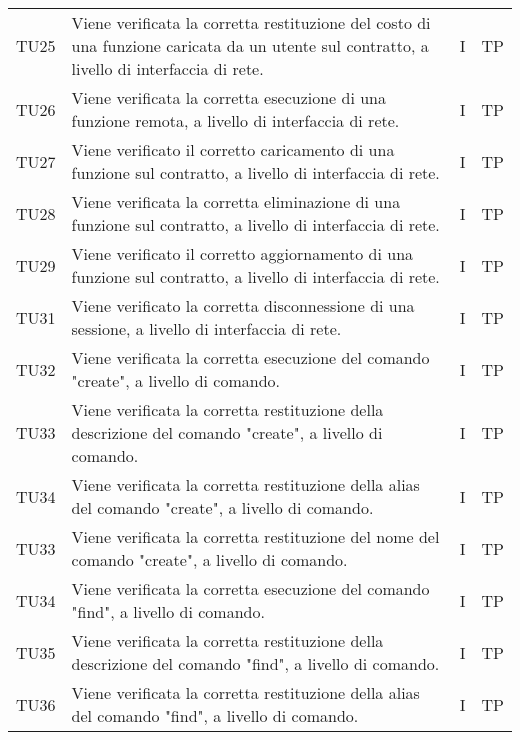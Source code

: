 \begin{longtable}{|C{1.5cm}|C{8cm}|C{3cm}|C{1cm}|}
	TU25 &
	Viene verificata la corretta restituzione del costo di una funzione caricata da un utente sul contratto, a livello di interfaccia di rete.  &
	I & TP\\

	TU26 &
	Viene verificata la corretta esecuzione di una funzione remota, a livello di interfaccia di rete.  &
	I & TP\\

	TU27 &
	Viene verificato il corretto caricamento di una funzione sul contratto, a livello di interfaccia di rete.  &
	I & TP\\

	TU28 &
	Viene verificata la corretta eliminazione di una funzione sul contratto, a livello di interfaccia di rete.  &
	I & TP\\

	TU29 &
	Viene verificato il corretto aggiornamento di una funzione sul contratto, a livello di interfaccia di rete.  &
	I & TP\\

	TU31 &
	Viene verificato la corretta disconnessione di una sessione, a livello di interfaccia di rete.  &
	I & TP\\

	TU32 &
	Viene verificata la corretta esecuzione del comando "create", a livello di comando.  &
	I & TP\\

	TU33 &
	Viene verificata la corretta restituzione della descrizione del comando "create", a livello di comando.  &
	I & TP\\

	TU34 &
	Viene verificata la corretta restituzione della alias del comando "create", a livello di comando.  &
	I & TP\\

	TU33 &
	Viene verificata la corretta restituzione del nome del comando "create", a livello di comando.  &
	I & TP\\

	TU34 &
	Viene verificata la corretta esecuzione del comando "find", a livello di comando.  &
	I & TP\\

	TU35 &
	Viene verificata la corretta restituzione della descrizione del comando "find", a livello di comando.  &
	I & TP\\

	TU36 &
	Viene verificata la corretta restituzione della alias del comando "find", a livello di comando.  &
	I & TP\\


\end{longtable}
